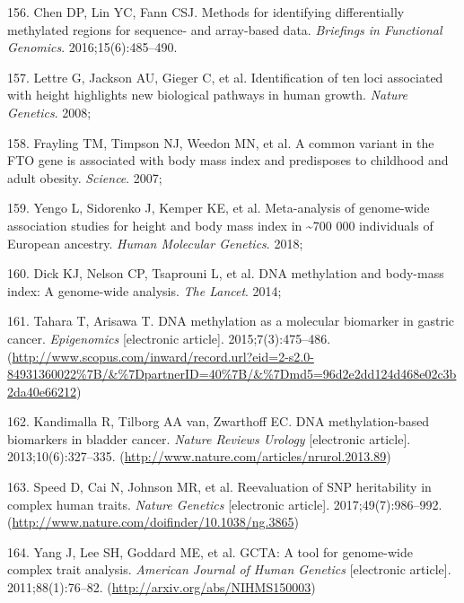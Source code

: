 \documentclass[11pt,oneside]{bristolthesis}
\newenvironment{cslreferences}%
  {}%
  {\par}
\begin{document}
\begin{cslreferences}
\leavevmode\hypertarget{ref-Chen2016}{}%
156. Chen DP, Lin YC, Fann CSJ. Methods for identifying differentially methylated regions for sequence- and array-based data. \emph{Briefings in Functional Genomics}. 2016;15(6):485--490.

\leavevmode\hypertarget{ref-Lettre2008}{}%
157. Lettre G, Jackson AU, Gieger C, et al. Identification of ten loci associated with height highlights new biological pathways in human growth. \emph{Nature Genetics}. 2008;

\leavevmode\hypertarget{ref-Frayling2007}{}%
158. Frayling TM, Timpson NJ, Weedon MN, et al. A common variant in the FTO gene is associated with body mass index and predisposes to childhood and adult obesity. \emph{Science}. 2007;

\leavevmode\hypertarget{ref-Yengo2018}{}%
159. Yengo L, Sidorenko J, Kemper KE, et al. Meta-analysis of genome-wide association studies for height and body mass index in \textasciitilde700 000 individuals of European ancestry. \emph{Human Molecular Genetics}. 2018;

\leavevmode\hypertarget{ref-Dick2014}{}%
160. Dick KJ, Nelson CP, Tsaprouni L, et al. DNA methylation and body-mass index: A genome-wide analysis. \emph{The Lancet}. 2014;

\leavevmode\hypertarget{ref-Tahara2015}{}%
161. Tahara T, Arisawa T. DNA methylation as a molecular biomarker in gastric cancer. \emph{Epigenomics} {[}electronic article{]}. 2015;7(3):475--486. (\url{http://www.scopus.com/inward/record.url?eid=2-s2.0-84931360022\%7B/\&\%7DpartnerID=40\%7B/\&\%7Dmd5=96d2e2dd124d468e02c3b2da40e66212})

\leavevmode\hypertarget{ref-Kandimalla2013}{}%
162. Kandimalla R, Tilborg AA van, Zwarthoff EC. DNA methylation-based biomarkers in bladder cancer. \emph{Nature Reviews Urology} {[}electronic article{]}. 2013;10(6):327--335. (\url{http://www.nature.com/articles/nrurol.2013.89})

\leavevmode\hypertarget{ref-Speed2017}{}%
163. Speed D, Cai N, Johnson MR, et al. Reevaluation of SNP heritability in complex human traits. \emph{Nature Genetics} {[}electronic article{]}. 2017;49(7):986--992. (\url{http://www.nature.com/doifinder/10.1038/ng.3865})

\leavevmode\hypertarget{ref-Yang2011}{}%
164. Yang J, Lee SH, Goddard ME, et al. GCTA: A tool for genome-wide complex trait analysis. \emph{American Journal of Human Genetics} {[}electronic article{]}. 2011;88(1):76--82. (\url{http://arxiv.org/abs/NIHMS150003})


\end{cslreferences}
\end{document}
